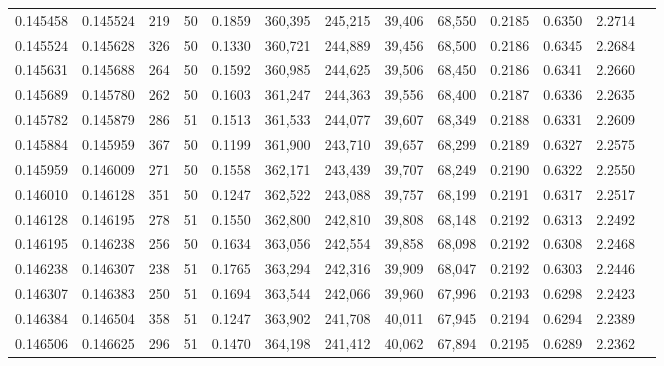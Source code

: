 \begin{tabular}{rrrrrrrrrrrrr}
0.145458 & 0.145524 &   219 &  50 &                                     0.1859 & 360,395 & 245,215 &  39,406 &  68,550 & 0.2185 & 0.6350 & 2.2714 \\
0.145524 & 0.145628 &   326 &  50 &                                     0.1330 & 360,721 & 244,889 &  39,456 &  68,500 & 0.2186 & 0.6345 & 2.2684 \\
0.145631 & 0.145688 &   264 &  50 &                                     0.1592 & 360,985 & 244,625 &  39,506 &  68,450 & 0.2186 & 0.6341 & 2.2660 \\
0.145689 & 0.145780 &   262 &  50 &                                     0.1603 & 361,247 & 244,363 &  39,556 &  68,400 & 0.2187 & 0.6336 & 2.2635 \\
0.145782 & 0.145879 &   286 &  51 &                                     0.1513 & 361,533 & 244,077 &  39,607 &  68,349 & 0.2188 & 0.6331 & 2.2609 \\
0.145884 & 0.145959 &   367 &  50 &                                     0.1199 & 361,900 & 243,710 &  39,657 &  68,299 & 0.2189 & 0.6327 & 2.2575 \\
0.145959 & 0.146009 &   271 &  50 &                                     0.1558 & 362,171 & 243,439 &  39,707 &  68,249 & 0.2190 & 0.6322 & 2.2550 \\
0.146010 & 0.146128 &   351 &  50 &                                     0.1247 & 362,522 & 243,088 &  39,757 &  68,199 & 0.2191 & 0.6317 & 2.2517 \\
0.146128 & 0.146195 &   278 &  51 &                                     0.1550 & 362,800 & 242,810 &  39,808 &  68,148 & 0.2192 & 0.6313 & 2.2492 \\
0.146195 & 0.146238 &   256 &  50 &                                     0.1634 & 363,056 & 242,554 &  39,858 &  68,098 & 0.2192 & 0.6308 & 2.2468 \\
0.146238 & 0.146307 &   238 &  51 &                                     0.1765 & 363,294 & 242,316 &  39,909 &  68,047 & 0.2192 & 0.6303 & 2.2446 \\
0.146307 & 0.146383 &   250 &  51 &                                     0.1694 & 363,544 & 242,066 &  39,960 &  67,996 & 0.2193 & 0.6298 & 2.2423 \\
0.146384 & 0.146504 &   358 &  51 &                                     0.1247 & 363,902 & 241,708 &  40,011 &  67,945 & 0.2194 & 0.6294 & 2.2389 \\
0.146506 & 0.146625 &   296 &  51 &                                     0.1470 & 364,198 & 241,412 &  40,062 &  67,894 & 0.2195 & 0.6289 & 2.2362 \\

\end{tabular}

